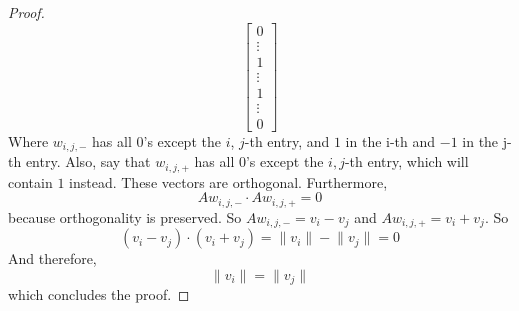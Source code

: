 \documentclass{article}
\begin{document}
\begin{proof}
\begin{equation*}
\begin{bmatrix}
                    0      \\
                    \vdots \\
                    1      \\
                    \vdots \\
                    1      \\
                    \vdots \\
                    0        
                \end{bmatrix}
            \end{equation*}
        Where $w_{i, j, -}$ has all $0$'s except the $i$, $j$-th entry, and $1$ in the i-th and $-1$ in the j-th entry. Also, say that $w_{i, j, +}$ has all $0$'s except the $i, j$-th entry, which will contain $1$ instead. These vectors are orthogonal. Furthermore, 
            \begin{equation*}
                Aw_{i, j, -} \cdot Aw_{i, j, +} = 0
            \end{equation*}
        because orthogonality is preserved. So $Aw_{i, j, -} = v_{i} - v_{j}$ and $Aw_{i, j, +} = v_{i} + v_{j}$. So
            \begin{equation*}
                (v_{i} - v_{j}) \cdot (v_{i} + v_{j}) = \lVert v_{i} \rVert - \lVert v_{j} \rVert = 0
            \end{equation*}
        And therefore, 
            \begin{equation*}
                \lVert v_{i} \rVert = \lVert v_{j} \rVert
            \end{equation*}
        which concludes the proof.
    \end{proof}

\newpage
\end{document}
